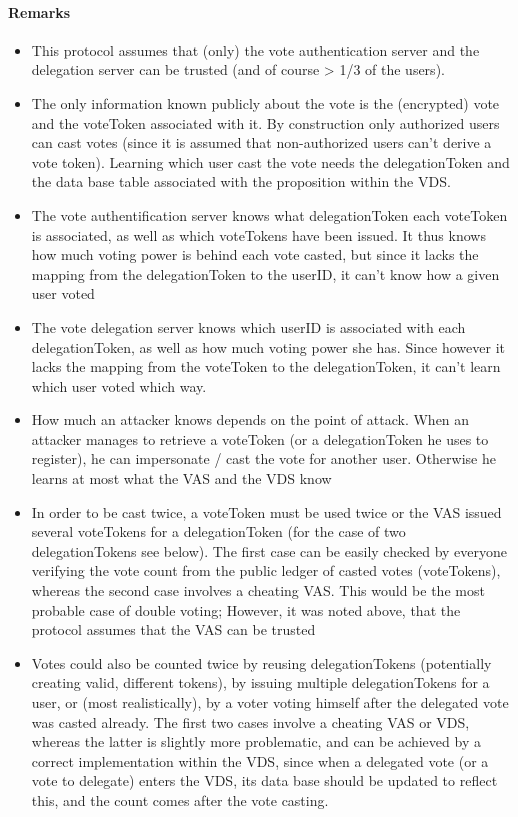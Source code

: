 \paragraph*{Remarks}
\begin{itemize}
\item This protocol assumes that (only) the vote authentication server and the delegation server can be trusted (and of course > 1/3 of the users).
\item The only information known publicly about the vote is the (encrypted) vote and the voteToken associated with it. By construction only authorized users can cast votes (since it is assumed that non-authorized users can't derive a vote token).  Learning which user cast the vote needs the delegationToken and the data base table associated with the proposition within the VDS.
\item The vote authentification server knows what delegationToken each voteToken is associated, as well as which voteTokens have been issued. It thus knows how much voting power is behind each vote casted, but since it lacks the mapping from the delegationToken to the userID, it can't know how a given user voted
\item The vote delegation server knows which userID is associated with each delegationToken, as well as how much voting power she has. Since however it lacks the mapping from the voteToken to the delegationToken, it can't learn which user voted which way.
\item How much an attacker knows depends on the point of attack. When an attacker manages to retrieve a voteToken (or a delegationToken he uses to register), he can impersonate / cast the vote for another user. Otherwise he learns at most what the VAS and the VDS know
\item In order to be cast twice, a voteToken must be used twice or the VAS issued several voteTokens for a delegationToken (for the case of two delegationTokens see below). The first case can be easily checked by everyone verifying the vote count from the public ledger of casted votes (voteTokens), whereas the second case involves a cheating VAS. This would be the most probable case of double voting; However, it was noted above, that the protocol assumes that the VAS can be trusted
\item Votes could also be counted twice by reusing delegationTokens (potentially creating valid, different tokens), by issuing multiple delegationTokens for a user, or (most realistically), by a voter voting himself after the delegated vote was casted already. The first two cases involve a cheating VAS or VDS, whereas the latter is slightly more problematic, and can be achieved by a correct implementation within the VDS, since when a delegated vote (or a vote to delegate) enters the VDS, its data base should be updated to reflect this, and the count comes after the vote casting.

\end{itemize}
